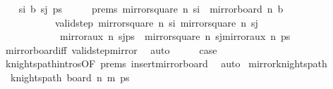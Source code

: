\begin{isabellebody}
\isamarkupfalse%
\isanewline
\ \ \isamarkupfalse%
\ {\isacharparenleft}{\kern0pt}{}\ s\isactrlsub i\ b\ s\isactrlsub j\ ps{\isacharparenright}{\kern0pt}\isanewline
\ \ \isamarkupfalse%
\ \isamarkupfalse%
\ prems{\isacharcolon}{\kern0pt}\ {\isachardoublequoteopen}mirror{}{\isacharunderscore}{\kern0pt}square\ n\ s\isactrlsub i\ {\isasymnotin}\ mirror{}{\isacharunderscore}{\kern0pt}board\ n\ b{\isachardoublequoteclose}\ \isanewline
\ \ \ \ \ \ \ \ \ \ \ \ {\isachardoublequoteopen}valid{\isacharunderscore}{\kern0pt}step\ {\isacharparenleft}{\kern0pt}mirror{}{\isacharunderscore}{\kern0pt}square\ n\ s\isactrlsub i{\isacharparenright}{\kern0pt}\ {\isacharparenleft}{\kern0pt}mirror{}{\isacharunderscore}{\kern0pt}square\ n\ s\isactrlsub j{\isacharparenright}{\kern0pt}{\isachardoublequoteclose}\ \isanewline
\ \ \ \ \ \ \ \ \ \ \ \ \ {\isachardoublequoteopen}mirror{}{\isacharunderscore}{\kern0pt}aux\ n\ {\isacharparenleft}{\kern0pt}s\isactrlsub j{\isacharhash}{\kern0pt}ps{\isacharparenright}{\kern0pt}\ {\isacharequal}{\kern0pt}\ mirror{}{\isacharunderscore}{\kern0pt}square\ n\ s\isactrlsub j{\isacharhash}{\kern0pt}mirror{}{\isacharunderscore}{\kern0pt}aux\ n\ ps{\isachardoublequoteclose}\isanewline
\ \ \ \ \isamarkupfalse%
\ {}\ mirror{}{\isacharunderscore}{\kern0pt}board{\isacharunderscore}{\kern0pt}iff\ valid{\isacharunderscore}{\kern0pt}step{\isacharunderscore}{\kern0pt}mirror{}\ \isamarkupfalse%
\ auto\isanewline
\ \ \isamarkupfalse%
\ \isamarkupfalse%
\ {\isacharquery}{\kern0pt}case\ \isanewline
\ \ \ \ \isamarkupfalse%
\ {}\ knights{\isacharunderscore}{\kern0pt}path{\isachardot}{\kern0pt}intros{\isacharparenleft}{\kern0pt}{}{\isacharparenright}{\kern0pt}{\isacharbrackleft}{\kern0pt}OF\ prems{\isacharbrackright}{\kern0pt}\ insert{\isacharunderscore}{\kern0pt}mirror{}{\isacharunderscore}{\kern0pt}board\ \isamarkupfalse%
\ auto\isanewline
{}\isamarkupfalse%
%
\endisatagproof
{\isafoldproof}%
%
\isadelimproof
\isanewline
%
\endisadelimproof
\isanewline
{}\isamarkupfalse%
\ mirror{}{\isacharunderscore}{\kern0pt}knights{\isacharunderscore}{\kern0pt}path{\isacharcolon}{\kern0pt}\isanewline
\ \ \ {\isachardoublequoteopen}knights{\isacharunderscore}{\kern0pt}path\ {\isacharparenleft}{\kern0pt}board\ n\ m{\isacharparenright}{\kern0pt}\ ps{\isachardoublequoteclose}\ \isanewline

\end{isabellebody}
